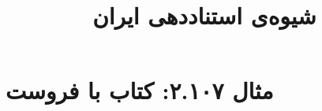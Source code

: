 \documentclass[a4paper,10pt]{article}
\begin{document}
\title{شیوه‌ی استناددهی ایران
 }
\author{}
\date{}
\maketitle



\section*{مثال ۲.۱۰۷: کتاب با فروست}

\cite{امانی1347}\\
\cite{گیلیپسی1970}\\
\cite{وست1992}\\
\cite{hopp1977}\\
\cite{tulchin2000}\\
\cite{wauchope1950}\\






\end{document}
